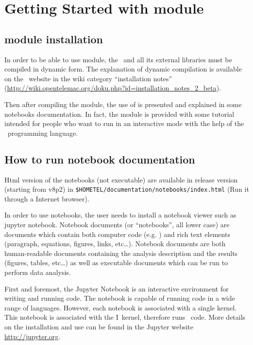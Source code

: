 \chapter{Getting Started with \TelApy{}  module}\label{ch:inp:outp}

\section{\TelApy{} module installation}

In order to be able to use \TelApy{} module, the \telemacsystem\ and all its
external libraries must be compiled in dynamic form. The explanation of dynamic
compilation is available on the \telemacsystem\ website in the wiki category
``installation notes''
(\url{http://wiki.opentelemac.org/doku.php?id=installation_notes_2_beta}).

Then after compiling the module, the use of \TelApy{} is presented and explained
in some notebooks documentation. In fact, the \TelApy{} module is provided with
some tutorial intended for people who want to run  in an
interactive mode with the help of the \python\ programming language.

\section{How to run notebook documentation}

Html version of the notebooks (not executable) are available in release version
(starting from v8p2) in \verb!$HOMETEL/documentation/notebooks/index.html! (Run
it through a Internet browser).

In order to use notebooks, the user needs to install a notebook viewer such as
jupyter notebook. Notebook documents (or ``notebooks'', all lower case) are
documents which contain both computer code (e.g. \python) and rich text elements
(paragraph, equations, figures, links, etc\ldots). Notebook documents are both
human-readable documents containing the analysis description and the results
(figures, tables, etc\ldots) as well as executable documents which can be run to
perform data analysis.

First and foremost, the Jupyter Notebook is an interactive environment for
writing and running code. The notebook is capable of running code in a wide
range of languages. However, each notebook is associated with a single kernel.
This notebook is associated with the I\python\ kernel, therefore runs \python\
code. More details on the installation and use can be found in the Jupyter
website \url{http://jupyter.org}.

